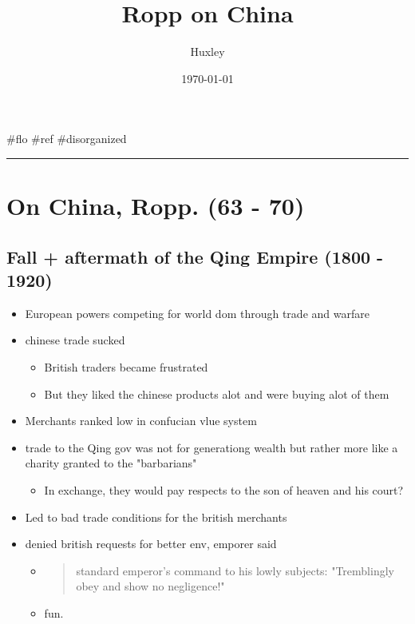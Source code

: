 \documentclass[letterpaper]{article}
\author{Huxley}
\date{\today}
\title{Ropp on China}
\renewcommand{\tableofcontents}{}
\begin{document}
\tableofcontents

\#flo \#ref \#disorganized

\noindent\rule{\textwidth}{0.5pt}

\section{On China, Ropp. (63 - 70)}
\label{sec:org7b42c8c}
\subsection{Fall + aftermath of the Qing Empire (1800 - 1920)}
\label{sec:orgc10965a}
\begin{itemize}
\item European powers competing for world dom through trade and warfare

\item chinese trade sucked

\begin{itemize}
\item British traders became frustrated
\item But they liked the chinese products alot and were buying alot of
them
\end{itemize}

\item Merchants ranked low in confucian vlue system

\item trade to the Qing gov was not for generationg wealth but rather more
like a charity granted to the "barbarians"

\begin{itemize}
\item In exchange, they would pay respects to the son of heaven and his
court?
\end{itemize}

\item Led to bad trade conditions for the british merchants

\item denied british requests for better env, emporer said

\begin{itemize}
\item \begin{quote}
standard emperor's command to his lowly subjects: "Tremblingly
obey and show no negligence!"
\end{quote}

\item fun.
\end{itemize}


\end{itemize}
\end{document}
